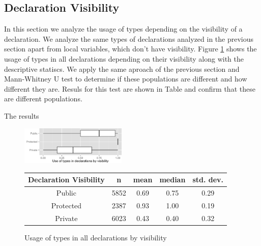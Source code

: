 \documentclass[preprint]{sigplanconf}
\begin{document}
\subsection{Declaration Visibility\label{sub:res_all_visibility}}
In this section we analyze the usage of types depending on the visibility of a declaration.
We analyze the same types of declarations analyzed in the previous section apart from local variables, which don't have visibility.
Figure \ref{fig:all_boxplot_visibility_all} shows the usage of types in all declarations depending on their visibility along with the descriptive statiscs.
We apply the same aproach of the previous section and Mann-Whitney U test to determine if these populations are different and how different they are.
Resuls for this test are shown in Table and confirm that these are different populations.

The results


\begin{figure}[h]
\centering 
\includegraphics[width=0.45\textwidth]{../analysis/result/all/boxplots/23_declarations_by_visibility.png} 
\label{fig:all_boxplot_visibility_all} 

\vspace{0.3cm}

\renewcommand{\arraystretch}{1.2}
\small
\begin{tabular}{|c|c|c|c|c|}
\hline
Declaration Visibility	& n		& mean	& median	& std. dev.	\\
\hline
\hline
Public    				& 5852	& 0.69	& 0.75		& 0.29		\\ \hline
Protected 				& 2387	& 0.93	& 1.00		& 0.19		\\ \hline
Private   				& 6023	& 0.43	& 0.40		& 0.32		\\ \hline
\end{tabular}

\caption{Usage of types in all declarations by visibility}

\end{figure}
\end{document}
